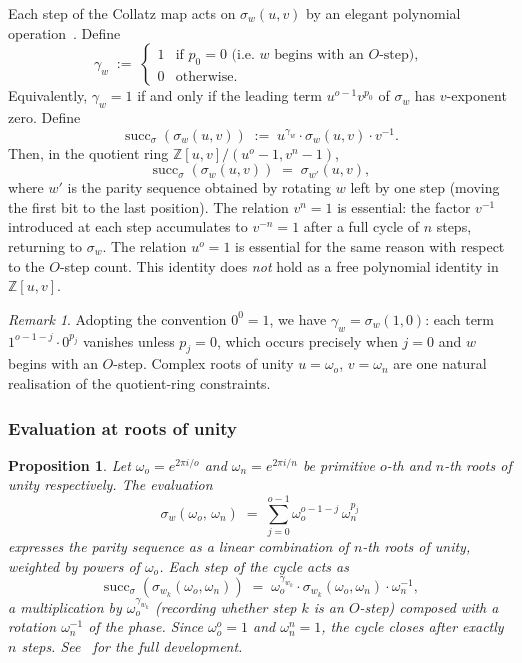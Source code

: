 \documentclass[12pt]{article}
\newtheorem{proposition}[theorem]{Proposition}
\theoremstyle{definition}
\theoremstyle{remark}
\newtheorem{remark}[theorem]{Remark}
\newcommand{\ZZ}{\mathbb{Z}}
\begin{document}
Each step of the Collatz map acts on $\sigma_w(u,v)$ by an elegant polynomial
operation~\cite{paper14}.  Define
\[
  \gamma_w \;:=\; \begin{cases} 1 & \text{if } p_0 = 0 \text{ (i.e.\ $w$ begins with an $O$-step)}, \\
                                0 & \text{otherwise.} \end{cases}
\tag{$\gamma$}\label{def:gamma}
\]
Equivalently, $\gamma_w = 1$ if and only if the leading term $u^{o-1} v^{p_0}$
of $\sigma_w$ has $v$-exponent zero.  Define
\[
  \operatorname{succ}_\sigma(\sigma_w(u,v))
  \;:=\; u^{\gamma_w} \cdot \sigma_w(u,v) \cdot v^{-1}.
\]
Then, in the quotient ring $\ZZ[u,v]/(u^o - 1, v^n - 1)$,
\[
  \operatorname{succ}_\sigma(\sigma_w(u,v)) \;=\; \sigma_{w'}(u,v),
\]
where $w'$ is the parity sequence obtained by rotating $w$ left by one step
(moving the first bit to the last position).  The relation $v^n = 1$ is
essential: the factor $v^{-1}$ introduced at each step accumulates to $v^{-n} = 1$
after a full cycle of $n$ steps, returning to $\sigma_w$.  The relation $u^o = 1$
is essential for the same reason with respect to the $O$-step count.
This identity does \emph{not} hold as a free polynomial identity in $\ZZ[u,v]$.

\begin{remark}
Adopting the convention $0^0 = 1$, we have $\gamma_w = \sigma_w(1, 0)$:
each term $1^{o-1-j} \cdot 0^{p_j}$ vanishes unless $p_j = 0$, which
occurs precisely when $j = 0$ and $w$ begins with an $O$-step.
Complex roots of unity $u = \omega_o$, $v = \omega_n$ are one natural
realisation of the quotient-ring constraints.
\end{remark}

\subsubsection*{Evaluation at roots of unity}

\begin{proposition}
\label{prop:sigma-roots}
Let $\omega_o = e^{2\pi i/o}$ and $\omega_n = e^{2\pi i/n}$ be primitive
$o$-th and $n$-th roots of unity respectively.  The evaluation
\[
  \sigma_w(\omega_o,\, \omega_n)
  \;=\; \sum_{j=0}^{o-1} \omega_o^{o-1-j}\, \omega_n^{p_j}
\]
expresses the parity sequence as a linear combination of $n$-th roots of
unity, weighted by powers of $\omega_o$.  Each step of the cycle acts as
\[
  \operatorname{succ}_\sigma(\sigma_{w_k}(\omega_o, \omega_n))
  \;=\; \omega_o^{\gamma_{w_k}} \cdot \sigma_{w_k}(\omega_o, \omega_n) \cdot \omega_n^{-1},
\]
a multiplication by $\omega_o^{\gamma_{w_k}}$ (recording whether step $k$ is
an $O$-step) composed with a rotation $\omega_n^{-1}$ of the phase.
Since $\omega_o^o = 1$ and $\omega_n^n = 1$, the cycle closes
after exactly $n$ steps.  See~\cite{paper14} for the full development.
\end{proposition}
\end{document}
